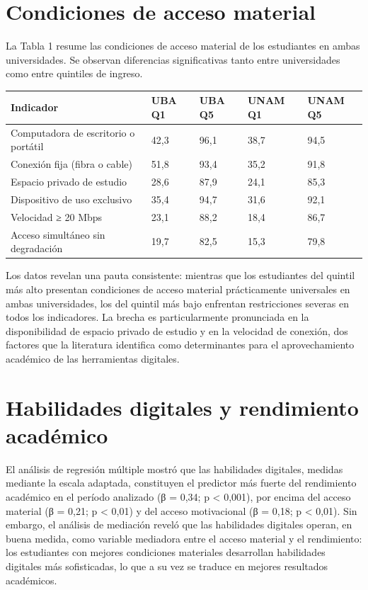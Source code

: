 \documentclass{article}
\begin{document}
\section{Condiciones de acceso material}
La Tabla 1 resume las condiciones de acceso material de los estudiantes en ambas universidades. Se observan diferencias significativas tanto entre universidades como entre quintiles de ingreso.


\begin{table}[!ht]
\centering
{\sf\footnotesize\setlength\tabcolsep{4pt}%
  \begin{tabular}{@{}lllll@{}}
    \toprule
    \textbf{\textbf{Indicador}} & \textbf{\textbf{UBA Q1}} & \textbf{\textbf{UBA Q5}} & \textbf{\textbf{UNAM Q1}} & \textbf{\textbf{UNAM Q5}} \\
    \midrule
    Computadora de escritorio o portátil & 42,3 & 96,1 & 38,7 & 94,5 \\
    \midrule
    Conexión fija (fibra o cable) & 51,8 & 93,4 & 35,2 & 91,8 \\
    \midrule
    Espacio privado de estudio & 28,6 & 87,9 & 24,1 & 85,3 \\
    \midrule
    Dispositivo de uso exclusivo & 35,4 & 94,7 & 31,6 & 92,1 \\
    \midrule
    Velocidad ≥ 20 Mbps & 23,1 & 88,2 & 18,4 & 86,7 \\
    \midrule
    Acceso simultáneo sin degradación & 19,7 & 82,5 & 15,3 & 79,8 \\
    \bottomrule
  \end{tabular}
}%
\label{tbl-1}
\end{table}

Los datos revelan una pauta consistente: mientras que los estudiantes del quintil más alto presentan condiciones de acceso material prácticamente universales en ambas universidades, los del quintil más bajo enfrentan restricciones severas en todos los indicadores. La brecha es particularmente pronunciada en la disponibilidad de espacio privado de estudio y en la velocidad de conexión, dos factores que la literatura identifica como determinantes para el aprovechamiento académico de las herramientas digitales.


\section{Habilidades digitales y rendimiento académico}
El análisis de regresión múltiple mostró que las habilidades digitales, medidas mediante la escala adaptada, constituyen el predictor más fuerte del rendimiento académico en el período analizado (β = 0,34; p < 0,001), por encima del acceso material (β = 0,21; p < 0,01) y del acceso motivacional (β = 0,18; p < 0,01). Sin embargo, el análisis de mediación reveló que las habilidades digitales operan, en buena medida, como variable mediadora entre el acceso material y el rendimiento: los estudiantes con mejores condiciones materiales desarrollan habilidades digitales más sofisticadas, lo que a su vez se traduce en mejores resultados académicos.
\end{document}
